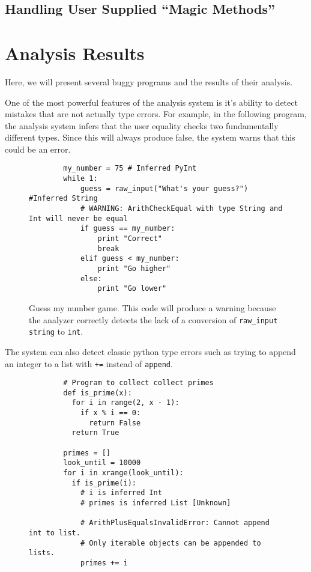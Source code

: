 \documentclass{article}[12pt]
\begin{document}
\subsection{Handling User Supplied ``Magic Methods''}
\section{Analysis Results}

Here, we will present several buggy programs and the results of their analysis.

One of the most powerful features of the analysis system is it's ability to detect mistakes that are
not actually type errors. For example, in the following program, the analysis system infers that the
user equality checks two fundamentally different types. Since this will always produce false, the
system warns that this could be an error.

\begin{figure}
    \begin{verbatim}
        my_number = 75 # Inferred PyInt
        while 1:
            guess = raw_input("What's your guess?") #Inferred String
            # WARNING: ArithCheckEqual with type String and Int will never be equal 
            if guess == my_number:
                print "Correct"
                break
            elif guess < my_number:
                print "Go higher"
            else:
                print "Go lower"
    \end{verbatim}
    \caption{Guess my number game. This code will produce a warning because the analyzer correctly
        detects the lack of a conversion of \texttt{raw\_input} \texttt{string} to \texttt{int}.}
\end{figure}

The system can also detect classic python type errors such as trying to append an integer to a list
with \texttt{+=} instead of \texttt{append}.
\begin{figure}
    \begin{verbatim}
        # Program to collect collect primes
        def is_prime(x):
          for i in range(2, x - 1):
            if x % i == 0:
              return False
          return True
        
        primes = []
        look_until = 10000
        for i in xrange(look_until):
          if is_prime(i):
            # i is inferred Int
            # primes is inferred List [Unknown]

            # ArithPlusEqualsInvalidError: Cannot append int to list. 
            # Only iterable objects can be appended to lists.
            primes += i
    \end{verbatim}
\end{figure}
\end{document}
